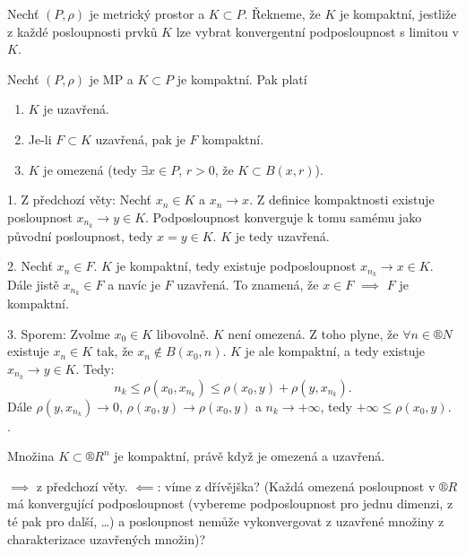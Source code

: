 \documentclass[12pt]{article}					%
\begin{document}
	\begin{definice}
		Nechť $(P, \rho)$ je metrický prostor a $K \subset P$. Řekneme, že $K$ je kompaktní, jestliže z každé posloupnosti prvků $K$ lze vybrat konvergentní podposloupnost s limitou v $K$.
	\end{definice}

	\begin{veta}
		Nechť $(P, \rho)$ je MP a $K \subset P$ je kompaktní. Pak platí

		\begin{enumerate}
			\item $K$ je uzavřená.
			\item Je-li $F \subset K$ uzavřená, pak je $F$ kompaktní.
			\item $K$ je omezená (tedy $\exists x \in P$, $r > 0$, že $K \subset B(x, r)$).
		\end{enumerate}

		\begin{dukazin}
			1. Z předchozí věty: Nechť $x_n \in K$ a $x_n \rightarrow x$. Z definice kompaktnosti existuje posloupnost $x_{n_k} \rightarrow y \in K$. Podposloupnost konverguje k tomu samému jako původní posloupnost, tedy $x = y \in K$. $K$ je tedy uzavřená.

			2. Nechť $x_n \in F$. $K$ je kompaktní, tedy existuje podposloupnost $x_{n_k} \rightarrow x \in K$. Dále jistě $x_{n_k} \in F$ a navíc je $F$ uzavřená. To znamená, že $x \in F$ $\implies$ $F$ je kompaktní.

			3. Sporem: Zvolme $x_0 \in K$ libovolně. $K$ není omezená. Z toho plyne, že $\forall n \in ®N$ existuje $x_n \in K$ tak, že $x_n \notin B(x_0, n)$. $K$ je ale kompaktní, a tedy existuje $x_{n_k} \rightarrow y \in K$. Tedy:
			$$ n_k ≤ \rho(x_0, x_{n_k}) ≤ \rho(x_0, y) + \rho(y, x_{n_k}). $$
			Dále $\rho(y, x_{n_k}) \rightarrow 0$, $\rho(x_0, y) \rightarrow \rho(x_0, y)$ a $n_k \rightarrow +∞$, tedy $+∞ ≤ \rho(x_0, y)$. \lightning.
		\end{dukazin}
	\end{veta}

	\begin{veta}
		Množina $K \subset ®R^n$ je kompaktní, právě když je omezená a uzavřená.

		\begin{dukazin}
			$\implies$ z předchozí věty. $\impliedby$: víme z dřívějška? (Každá omezená posloupnost v $®R$ má konvergující podposloupnost (vybereme podposloupnost pro jednu dimenzi, z té pak pro další, …) a posloupnost nemůže vykonvergovat z uzavřené množiny z charakterizace uzavřených množin)?
		\end{dukazin}
	\end{veta}
\end{document}
